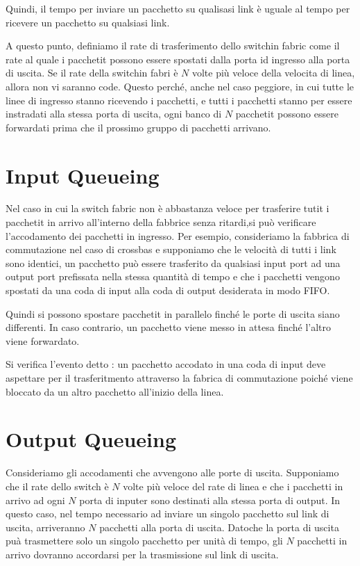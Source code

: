 \documentclass{book}
\newcommand{\tmtextbf}[1]{\text{{\bfseries{#1}}}}
\begin{document}
Quindi, il tempo per inviare un pacchetto su qualisasi link {\`e} uguale al
tempo per ricevere un pacchetto su qualsiasi link.

A questo punto, definiamo il rate di trasferimento dello switchin fabric come
il rate al quale i pacchetit possono essere spostati dalla porta id ingresso
alla porta di uscita. Se il rate della switchin fabri {\`e} $N$ volte pi{\`u}
veloce della velocita di linea, allora non vi saranno code. Questo perch{\'e},
anche nel caso peggiore, in cui tutte le linee di ingresso stanno ricevendo i
pacchetti, e tutti i pacchetti stanno per essere instradati alla stessa porta
di uscita, ogni banco di $N$ pacchetit possono essere forwardati prima che il
prossimo gruppo di pacchetti arrivano.

\section{Input Queueing}

Nel caso in cui la switch fabric non {\`e} abbastanza veloce per trasferire
tutit i pacchetit in arrivo all'interno della fabbrice senza ritardi,si
pu{\`o} verificare l'accodamento dei pacchetti in ingresso. Per esempio,
consideriamo la fabbrica di commutazione nel caso di crossbas e supponiamo che
le velocit{\`a} di tutti i link sono identici, un pacchetto pu{\`o} essere
trasferito da qualsiasi input port ad una output port prefissata nella stessa
quantit{\`a} di tempo e che i pacchetti vengono spostati da una coda di input
alla coda di output desiderata in modo FIFO.

Quindi si possono spostare pacchetit in parallelo finch{\'e} le porte di
uscita siano differenti. In caso contrario, un pacchetto viene messo in attesa
finch{\'e} l'altro viene forwardato.

Si verifica l'evento detto \tmtextbf{head-of-the-line (HOL)} : un pacchetto
accodato in una coda di input deve aspettare per il trasferitmento attraverso
la fabrica di commutazione poich{\'e} viene bloccato da un altro pacchetto
all'inizio della linea.

\section{Output Queueing}

Consideriamo gli accodamenti che avvengono alle porte di uscita. Supponiamo
che il rate dello switch {\`e} $N$ volte pi{\`u} veloce del rate di linea e
che i pacchetti in arrivo ad ogni $N$ porta di inputer sono destinati alla
stessa porta di output. In questo caso, nel tempo necessario ad inviare un
singolo pacchetto sul link di uscita, arriveranno $N$ pacchetti alla porta di
uscita. Dato\quad che la porta di uscita pu{\`a} trasmettere solo un singolo
pacchetto per unit{\`a} di tempo, gli $N$ pacchetti in arrivo dovranno
accordarsi per la trasmissione sul link di uscita.
\end{document}
